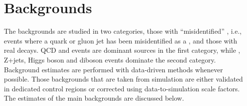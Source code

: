 \section{Backgrounds}
\label{sect:bkg}
The backgrounds are studied in two categories, those with 
``misidentified'' \Tau, i.e., events where a quark or gluon jet has been misidentified
as a \Tau, and those with real \Tau decays.
QCD and \wjets events are dominant sources in the first category, while \ttbar, Z+jets, Higgs boson and diboson
events dominate the second category. Background estimates are performed with data-driven methods whenever possible. 
Those backgrounds that are taken from simulation are either validated in dedicated control regions or corrected using data-to-simulation scale factors. The estimates of the main backgrounds are discussed below.

